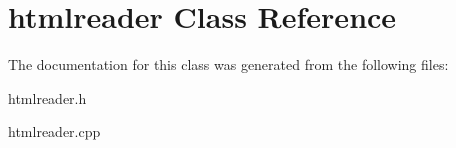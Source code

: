 \hypertarget{classhtmlreader}{}\section{htmlreader Class Reference}
\label{classhtmlreader}


The documentation for this class was generated from the following files\+:\begin{DoxyCompactItemize}
\item 
htmlreader.\+h\item 
htmlreader.\+cpp\end{DoxyCompactItemize}
